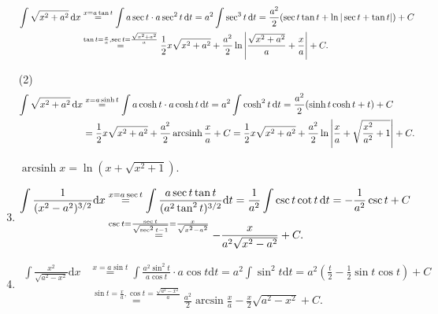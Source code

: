 \begin{solution}
\begin{enumerate}
            \begin{align*}
                \int \sqrt{x^2+a^2} \operatorname{d\!} x & \overset{x = a \tan t}{=} \int a \sec t \cdot a \sec^2 t \operatorname{d\!} t = a^2 \int \sec^3 t \operatorname{d\!} t = \frac{a^2}{2} (\sec t \tan t + \ln |\sec t + \tan t|) + C                                \\
                                           & \overset{\tan t = \frac{x}{a},\sec t = \frac{\sqrt{x^2 + a^2}}{a}}{=} \frac{1}{2} x \sqrt{x^2 + a^2} + \frac{a^2}{2} \ln \left| \frac{\sqrt{x^2 + a^2}}{a} + \frac{x}{a} \right| + C.
            \end{align*}
        \item[(2)]
            \begin{align*}
                \int \sqrt{x^2+a^2} \operatorname{d\!} x & \overset{x = a \sinh t}{=} \int a \cosh t \cdot a \cosh t \operatorname{d\!} t = a^2 \int \cosh^2 t \operatorname{d\!} t = \frac{a^2}{2} (\sinh t \cosh t + t) + C                                                                   \\
                                           & =\frac{1}{2} x \sqrt{x^2 + a^2} + \frac{a^2}{2} \operatorname{arcsinh} \frac{x}{a} + C = \frac{1}{2} x \sqrt{x^2 + a^2} + \frac{a^2}{2} \ln \left| \frac{x}{a} + \sqrt{\frac{x^2}{a^2} + 1} \right| + C.
            \end{align*}
            \begin{remark}
                $\operatorname{arcsinh} x = \ln (x + \sqrt{x^2 + 1})$.
            \end{remark}
        \item \begin{align*}
                  \int \frac{1}{(x^2 - a^2)^{3/2}} \mathrm{d}x & \overset{x = a \sec t}{=} \int \frac{a \sec t \tan t}{(a^2 \tan^2 t)^{3/2}} \mathrm{d}t = \frac{1}{a^2} \int \csc t \cot t \operatorname{d\!} t = -\frac{1}{a^2} \csc t + C \\
                                                               & \overset{\csc t = \frac{\sec t}{\sqrt{\sec^2 t - 1}} = \frac{x}{\sqrt{x^2 - a^2}}}{=} -\frac{x}{a^2 \sqrt{x^2 - a^2}} + C.
              \end{align*}
        \item \begin{align*}
                  \int \frac{x^2}{\sqrt{a^2 - x^2}} \mathrm{d}x & \overset{x = a \sin t}{=} \int \frac{a^2 \sin^2 t}{a \cos t} \cdot a \cos t \mathrm{d}t = a^2 \int \sin^2 t \mathrm{d}t = a^2 \left( \frac{t}{2} - \frac{1}{2} \sin t \cos t \right) + C \\
                                                                & \overset{\sin t = \frac{x}{a},\cos t = \frac{\sqrt{a^2 - x^2}}{a}}{=} \frac{a^2}{2} \arcsin \frac{x}{a} - \frac{x}{2} \sqrt{a^2 - x^2} + C.

\end{align*}
\end{enumerate}
\end{solution}
